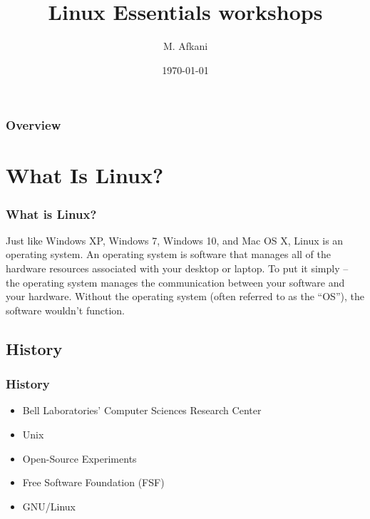 \documentclass{beamer}
\title[Linux essentials]{Linux Essentials workshops} %
\author{M. Afkani} %
\institute[Kharazmi University] %
{
Kharazmi University of Tehran \\ %
\medskip
\textit{afkani.ir} %
}
\date{\today} %
\begin{document}
\begin{frame}
\titlepage %
\end{frame}

\begin{frame}
\frametitle{Overview} %
\tableofcontents %
\end{frame}


\section{What Is Linux?} %
\begin{frame}
\frametitle{What is Linux?}
Just like Windows XP, Windows 7, Windows 10, and Mac OS X, Linux is an operating system. An operating system is software that manages all of the hardware resources associated with your desktop or laptop. To put it simply – the operating system manages the communication between your software and your hardware. Without the operating system (often referred to as the “OS”), the software wouldn’t function.
\end{frame}

\subsection{History}
\begin{frame}
\frametitle{History}
\begin{itemize}
\item Bell Laboratories’ Computer Sciences Research Center
\item Unix
\item Open-Source Experiments
\item Free Software Foundation (FSF)
\item GNU/Linux
\end{itemize}
\end{frame}
\end{document}
